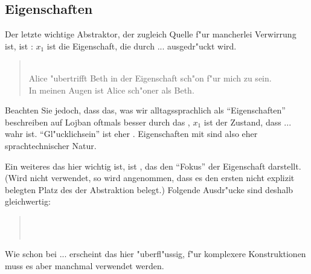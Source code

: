 \subsection{Eigenschaften}
Der letzte wichtige Abstraktor, der zugleich Quelle f"ur mancherlei Verwirrung ist, ist : $x_1$ ist die Eigenschaft, die durch ...
ausgedr"uckt wird.
\begin{quote}
 \\
Alice "ubertrifft Beth in der Eigenschaft sch"on f"ur mich zu sein. \\
In meinen Augen ist Alice sch"oner als Beth.
\end{quote}

Beachten Sie jedoch, dass das, was wir alltagssprachlich als ``Eigenschaften'' beschreiben auf Lojban oftmals besser durch das , $x_1$
ist der Zustand, dass ... wahr ist. ``Gl"ucklichsein'' ist eher .
Eigenschaften mit  sind also eher sprachtechnischer Natur.

Ein weiteres  das hier wichtig ist, ist , das den ``Fokus'' der Eigenschaft darstellt. (Wird  nicht verwendet, so wird
angenommen, dass es den ersten nicht explizit belegten Platz des  der Abstraktion belegt.) Folgende Ausdr"ucke sind deshalb gleichwertig:
\begin{quote}
 \\
 \\
\end{quote}

Wie schon bei ... erscheint das  hier "uberfl"ussig, f"ur komplexere Konstruktionen muss es aber manchmal verwendet werden.

